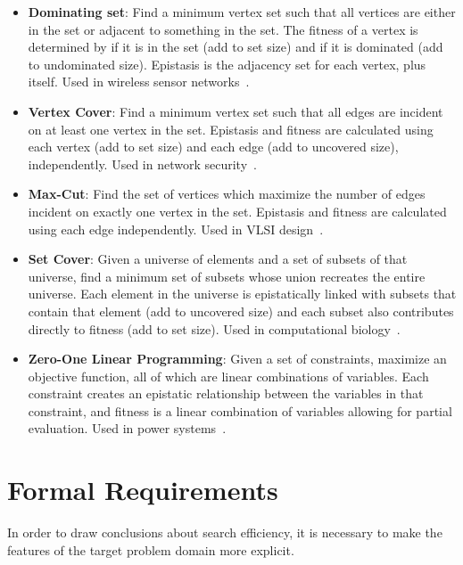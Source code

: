 \begin{itemize}
\item \textbf{Dominating set}: Find a minimum vertex
set such that all vertices are either in the set or adjacent to something in the set.
The fitness of a vertex is determined by if it is in the set (add to set size) and if
it is dominated (add to undominated size). Epistasis is the adjacency set for each
vertex, plus itself. Used in wireless sensor networks~\cite{zhao:2013:dominatingset}.

\item \textbf{Vertex Cover}: Find a minimum vertex
set such that all edges are incident on at least one vertex in the set.
Epistasis and fitness are calculated using each vertex (add to set size)
and each edge (add to uncovered size), independently. Used in network security~\cite{richter:2007:vertexcover}.

\item \textbf{Max-Cut}: Find the set of vertices which maximize the number of edges
incident on exactly one vertex in the set. Epistasis and fitness are calculated
using each edge independently. Used in VLSI design~\cite{festa:2002:maxcut}.

\item \textbf{Set Cover}: Given a universe of elements and a set of subsets of that universe,
find a minimum set of subsets whose union recreates the entire universe. Each element in
the universe is epistatically linked with subsets that contain that element (add to uncovered size)
and each subset also contributes directly to fitness (add to set size). Used in
computational biology~\cite{painsky:2014:setcover}.

\item \textbf{Zero-One Linear Programming}: Given a set of constraints, maximize an
objective function, all of which are linear combinations of variables. Each constraint
creates an epistatic relationship between the variables in that constraint, and fitness
is a linear combination of variables allowing for partial evaluation. Used in power systems~\cite{arroyo:2000:linearprogram}.
\end{itemize}

\section{Formal Requirements}
In order to draw conclusions about search efficiency, it is necessary to make the features
of the target problem domain more explicit.

